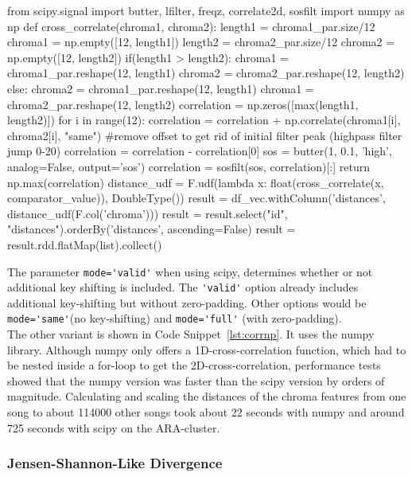 \begin{pythonCode}[frame=single,label={lst:corrnp},caption={Cross-correlation numpy},captionpos=b]
from scipy.signal import butter, lfilter, freqz, correlate2d, sosfilt
import numpy as np
def cross_correlate(chroma1, chroma2):
    length1 = chroma1_par.size/12
    chroma1 = np.empty([12, length1])
    length2 = chroma2_par.size/12
    chroma2 = np.empty([12, length2])
    if(length1 > length2):
        chroma1 = chroma1_par.reshape(12, length1)
        chroma2 = chroma2_par.reshape(12, length2)
    else:
        chroma2 = chroma1_par.reshape(12, length1)
        chroma1 = chroma2_par.reshape(12, length2)      
    correlation = np.zeros([max(length1, length2)])
    for i in range(12):
        correlation = correlation + np.correlate(chroma1[i], chroma2[i], "same")    
    #remove offset to get rid of initial filter peak (highpass filter jump 0-20)
    correlation = correlation - correlation[0]
    sos = butter(1, 0.1, 'high', analog=False, output='sos')
    correlation = sosfilt(sos, correlation)[:]
    return np.max(correlation)
distance_udf = F.udf(lambda x: float(cross_correlate(x, comparator_value)), DoubleType())
result = df_vec.withColumn('distances', distance_udf(F.col('chroma')))
result = result.select("id", "distances").orderBy('distances', ascending=False)
result = result.rdd.flatMap(list).collect()
\end{pythonCode}

\noindent The parameter \lstinline{mode='valid'} when using scipy, determines whether or not additional key shifting is included. The \lstinline{'valid'} option already includes additional key-shifting but without zero-padding. Other options would be \lstinline{mode='same'}(no key-shifting) and \lstinline{mode='full'} (with zero-padding).\\
\noindent The other variant is shown in Code Snippet~\ref{lst:corrnp}. It uses the numpy library. Although numpy only offers a 1D-cross-correlation function, which had to be nested inside a for-loop to get the 2D-cross-correlation, performance tests showed that the numpy version was faster than the scipy version by orders of magnitude. Calculating and scaling the distances of the chroma features from one song to about 114000 other songs took about 22 seconds with numpy and around 725 seconds with scipy on the ARA-cluster. 

\subsubsection{Jensen-Shannon-Like Divergence}\label{jsld}

